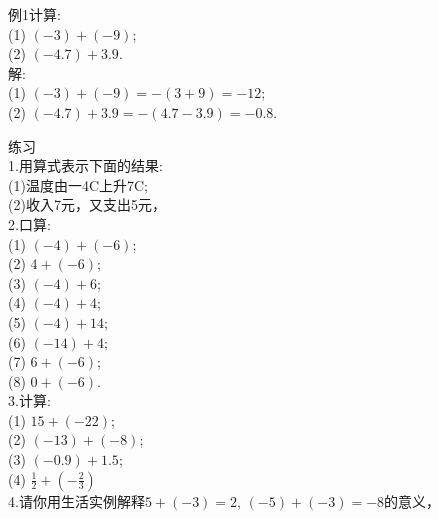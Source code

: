 \documentclass{article}
\begin{document}
\begin{example}
    
    例1计算:\\
    
    (1) $(-3)+(-9)$;\\
    
    (2) $(-4.7)+3.9$.\\
    
    解: \\
    (1) $(-3)+(-9)=-(3+9)=-12$;\\

    (2) $(-4.7)+3.9=-(4.7-3.9)=-0.8$.\\

\end{example}
    
\begin{exercise}
    
    练习\\
    
    1.用算式表示下面的结果:\\
    
    (1)温度由一4C上升7C;\\
    (2)收入7元，又支出5元，\\
    
    2.口算:\\

    (1) $(-4)+(-6)$;\\
    
    (2) $4+(- 6)$;\\
    
    (3) $(-4)+6$;\\

    (4) $(-4)+4$;\\
    
    (5) $(-4)+14$;\\
    
    (6) $(-14)+4$;\\
    
    (7) $6+(-6)$;\\

    (8) $0+(-6)$.\\
    
    
    3.计算:\\

    (1) $15+(-22)$;\\
    
    (2) $(-13)+(-8)$;\\
    
    (3) $(-0.9)+1.5$;\\

    (4) $\frac{1}{2}+(-\frac{2}{3})$\\

    4.请你用生活实例解释$5+(-3)=2$, $(-5)+(-3)=-8$的意义，\\
    
\end{exercise}
\end{document}
